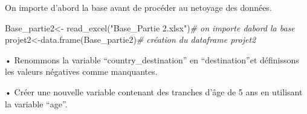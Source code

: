\documentclass[
]{article}
\newenvironment{Shaded}{\begin{snugshade}}{\end{snugshade}}
\newcommand{\AttributeTok}[1]{\textcolor[rgb]{0.77,0.63,0.00}{#1}}
\newcommand{\CommentTok}[1]{\textcolor[rgb]{0.56,0.35,0.01}{\textit{#1}}}
\newcommand{\ConstantTok}[1]{\textcolor[rgb]{0.00,0.00,0.00}{#1}}
\newcommand{\DecValTok}[1]{\textcolor[rgb]{0.00,0.00,0.81}{#1}}
\newcommand{\FunctionTok}[1]{\textcolor[rgb]{0.00,0.00,0.00}{#1}}
\newcommand{\NormalTok}[1]{#1}
\newcommand{\OtherTok}[1]{\textcolor[rgb]{0.56,0.35,0.01}{#1}}
\newcommand{\SpecialCharTok}[1]{\textcolor[rgb]{0.00,0.00,0.00}{#1}}
\newcommand{\StringTok}[1]{\textcolor[rgb]{0.31,0.60,0.02}{#1}}
\begin{document}
On importe d'abord la base avant de procéder au netoyage des données.

\begin{Shaded}
\begin{Highlighting}[]
\NormalTok{Base\_partie2}\OtherTok{\textless{}{-}} \FunctionTok{read\_excel}\NormalTok{(}\StringTok{"Base\_Partie 2.xlsx"}\NormalTok{)}\CommentTok{\# on importe d\textquotesingle{}abord la base}
\NormalTok{projet2}\OtherTok{\textless{}{-}}\FunctionTok{data.frame}\NormalTok{(Base\_partie2)}\CommentTok{\# création du dataframe projet2}
\end{Highlighting}
\end{Shaded}

• Renommons la variable ``country\_destination'' en ``destination''et
définissons les valeurs négatives comme manquantes.

\begin{Shaded}
\end{Shaded}

• Créer une nouvelle variable contenant des tranches d'âge de 5 ans en
utilisant la variable ``age''.
\end{document}
